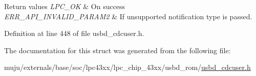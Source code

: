 \begin{DoxyRetVals}{Return values}
{\em L\+P\+C\+\_\+\+OK} & On success \\
\hline
{\em E\+R\+R\+\_\+\+A\+P\+I\+\_\+\+I\+N\+V\+A\+L\+I\+D\+\_\+\+P\+A\+R\+A\+M2} & If unsupported notification type is passed. \\
\hline
\end{DoxyRetVals}


Definition at line 448 of file usbd\+\_\+cdcuser.\+h.



The documentation for this struct was generated from the following file\+:\begin{DoxyCompactItemize}
\item 
muju/externals/base/soc/lpc43xx/lpc\+\_\+chip\+\_\+43xx/usbd\+\_\+rom/\hyperlink{usbd__cdcuser_8h}{usbd\+\_\+cdcuser.\+h}\end{DoxyCompactItemize}
